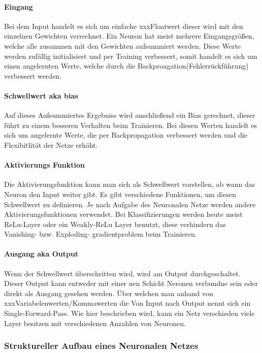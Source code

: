 \paragraph{Eingang}
Bei dem Input handelt es sich um einfache xxxFloatwert dieser wird mit den einzelnen Gewichten verrechnet. Ein Neuron hat meist mehrere Eingangsgrößen, welche alle zusammen mit den Gewichten aufsummiert werden. Diese Werte werden zufällig initialisiert und per Training verbessert, somit handelt es sich um einen angelernten Werte, welche durch die Backproagation(Fehlerrückführung) verbessert werden.

\paragraph{Schwellwert aka bias}
Auf dieses Aufsummiertes Ergebniss wird anschließend ein Bias gerechnet, dieser führt zu einem besseren Verhalten beim Trainieren. Bei diesen Werten handelt es sich um angelernte Werte, die per Backpropagation verbessert werden und die Flexibitlität der Netze erhöht.


\paragraph{Aktivierungs Funktion}
Die Aktivierungsfunktion kann man sich als Schwellwert vorstellen, ab wann das Neuron den Input weiter gibt. Es gibt verschiedene Funktionen, um diesen Schwellwert zu definieren. Je nach Aufgabe des Neuronalen Netze werden andere Aktivierungsfunktionen verwendet. Bei Klassifizierungen werden heute meist ReLu-Layer oder ein Weakly-ReLu Layer benutzt, diese verhindern das Vanishing- bzw. Exploding- gradientproblem beim Trainieren.

\paragraph{Ausgang aka Output}
Wenn der Schwellwert überschritten wird, wird am Output durchgeschaltet. Dieser Output kann entweder mit einer nen Schicht Neronen verbundne sein oder direkt als Ausgang gesehen werden. Über welchen man anhand von xxxVariabelenwerten/Kommawerten die 
Von Input nach Output nennt sich ein Single-Forward-Pass. Wie hier beschrieben wird, kann ein Netz verschieden viele Layer besitzen mit verschiedenen Anzahlen von Neuronen.

\subsubsection{Struktureller Aufbau eines Neuronalen Netzes}

